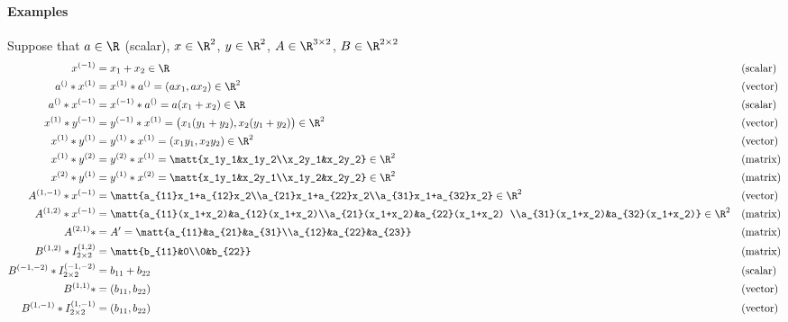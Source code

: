 \documentclass[11pt]{article}
\theoremstyle{remark}
\begin{document}
\paragraph{Examples}

Suppose that $a\in\R$ (scalar), $x\in\R^2$, $y\in\R^2$, $A\in\R^{3\times 2}$, $B\in\R^{2\times 2}$
\begin{align*}
  x^{(-1)} &= x_1+x_2\in\R && \text{(scalar)}\\
  a^{()} * x^{(1)} &= x^{(1)} * a^{()} =(a x_1, a x_2) \in \R^2 && \text{(vector)}\\
  a^{()} * x^{(-1)} &= x^{(-1)} * a^{()} = a (x_1+x_2) \in\R && \text{(scalar)}\\
  x^{(1)} * y^{(-1)} &= y^{(-1)} * x^{(1)} =\big(x_1 (y_1+y_2), x_2 (y_1+y_2)\big) \in\R^2 && \text{(vector)}\\
  x^{(1)} * y^{(1)} &= y^{(1)} * x^{(1)} =(x_1 y_1, x_2 y_2) \in\R^2 && \text{(vector)}\\
  x^{(1)} * y^{(2)} &= y^{(2)} * x^{(1)}=\matt{x_1y_1&x_1y_2\\x_2y_1&x_2y_2} \in\R^2 && \text{(matrix)}\\
  x^{(2)} * y^{(1)} &=  y^{(1)} * x^{(2)}=\matt{x_1y_1&x_2y_1\\x_1y_2&x_2y_2} \in\R^2 && \text{(matrix)}\\
  A^{(1,-1)} * x^{(-1)} &= \matt{a_{11}x_1+a_{12}x_2\\a_{21}x_1+a_{22}x_2\\a_{31}x_1+a_{32}x_2}\in\R^2 &&\text{(vector)}\\
  A^{(1,2)} * x^{(-1)} &= \matt{a_{11}(x_1+x_2)&a_{12}(x_1+x_2)\\a_{21}(x_1+x_2)&a_{22}(x_1+x_2) \\a_{31}(x_1+x_2)&a_{32}(x_1+x_2)}\in\R^2&& \text{(matrix)}\\
  A^{(2,1)} * &= A'=\matt{a_{11}&a_{21}&a_{31}\\a_{12}&a_{22}&a_{23}}&& \text{(matrix)}\\
  B^{(1,2)} * I_{2\times 2}^{(1,2)}&=\matt{b_{11}&0\\0&b_{22}}&& \text{(matrix)}\\
  B^{(-1,-2)} * I_{2\times 2}^{(-1,-2)}&=b_{11}+b_{22}&& \text{(scalar)}\\
  B^{(1,1)} * &= (b_{11},b_{22}) && \text{(vector)}\\
  B^{(1,-1)} * I_{2\times 2}^{(1,-1)}&=(b_{11},b_{22}) && \text{(vector)}\\
\end{align*}
\end{document}
